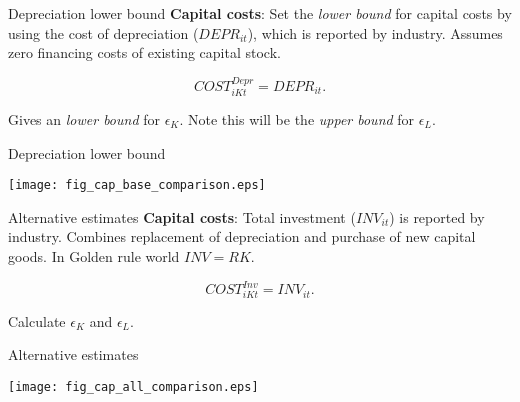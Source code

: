 \documentclass[10pt,xcolor=dvipsnames]{beamer}
\begin{document}
\begin{frame}{Depreciation lower bound}
\textbf{Capital costs}: Set the \textit{lower bound} for capital costs by using the cost of depreciation ($DEPR_{it}$), which is reported by industry. Assumes zero financing costs of existing capital stock.

\begin{equation}
  COST_{iKt}^{Depr} = DEPR_{it}.
\end{equation}

Gives an \textit{lower bound} for $\epsilon_K$. Note this will be the \textit{upper bound} for $\epsilon_L$.

\end{frame}

\begin{frame}{Depreciation lower bound}
\begin{center}
\texttt{[image: fig\_cap\_base\_comparison.eps]}
\end{center}
\end{frame}

\begin{frame}{Alternative estimates}
\textbf{Capital costs}: Total investment ($INV_{it}$) is reported by industry. Combines replacement of depreciation and purchase of new capital goods. In Golden rule world $INV = RK$. 

\begin{equation}
  COST_{iKt}^{Inv} = INV_{it}.
\end{equation}

Calculate $\epsilon_K$ and $\epsilon_L$. 

\end{frame}

\begin{frame}{Alternative estimates}
\begin{center}
\texttt{[image: fig\_cap\_all\_comparison.eps]}
\end{center}
\end{frame}
\end{document}
